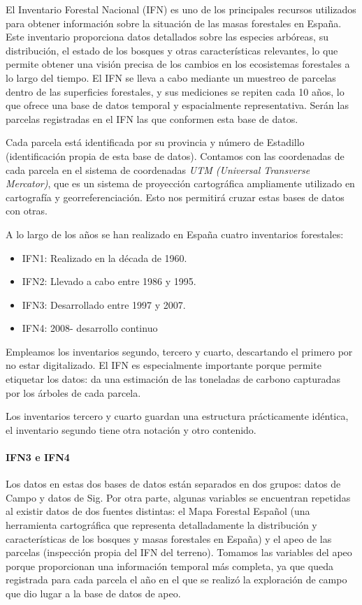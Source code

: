 El Inventario Forestal Nacional (IFN) es uno de los principales recursos utilizados para obtener información sobre la situación de las masas forestales en España. Este inventario proporciona datos detallados sobre las especies arbóreas, su distribución, el estado de los bosques y otras características relevantes, lo que permite obtener una visión precisa de los cambios en los ecosistemas forestales a lo largo del tiempo. El IFN se lleva a cabo mediante un muestreo de parcelas dentro de las superficies forestales, y sus mediciones se repiten cada 10 años, lo que ofrece una base de datos temporal y espacialmente representativa. Serán las parcelas registradas en el IFN las que conformen esta base de datos. 

\medskip

Cada parcela está identificada por su provincia y número de Estadillo (identificación propia de esta base de datos). Contamos con las coordenadas de cada parcela en el sistema de coordenadas \textit{UTM (Universal Transverse Mercator)}, que es un sistema de proyección cartográfica ampliamente utilizado en cartografía y georreferenciación. Esto nos permitirá cruzar estas bases de datos con otras. 

\medskip

A lo largo de los años se han realizado en España cuatro inventarios forestales: 
\begin{itemize}
    \item IFN1: Realizado en la década de 1960.
    \item IFN2: Llevado a cabo entre 1986 y 1995.
    \item IFN3: Desarrollado entre 1997 y 2007.
    \item IFN4: 2008- desarrollo continuo 
\end{itemize}

Empleamos los inventarios segundo, tercero y cuarto, descartando el primero por no estar digitalizado. El IFN es especialmente importante porque permite etiquetar los datos: da una estimación de las toneladas de carbono capturadas por los árboles de cada parcela.

\medskip

Los inventarios tercero y cuarto guardan una estructura prácticamente idéntica, el inventario segundo tiene otra notación y otro contenido.

\paragraph{\textbf{IFN3 e IFN4}} Los datos en estas dos bases de datos están separados en dos grupos: datos de Campo y datos de Sig. Por otra parte, algunas variables se encuentran repetidas al existir datos de dos fuentes distintas: el Mapa Forestal Español (una herramienta cartográfica que representa detalladamente la distribución y características de los bosques y masas forestales en España) y el apeo de las parcelas (inspección propia del IFN del terreno). Tomamos las variables del apeo porque proporcionan una información temporal más completa, ya que queda registrada para cada parcela el año en el que se realizó la exploración de campo que dio lugar a la base de datos de apeo.

